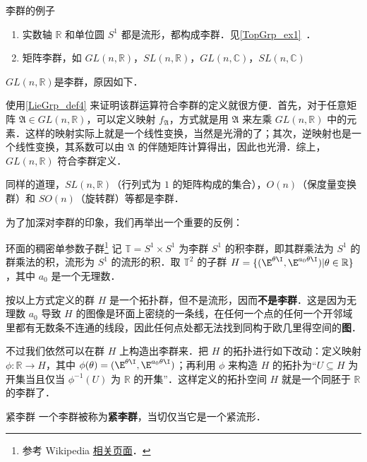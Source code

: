 \begin{example}{李群的例子}
\begin{enumerate}
\item 实数轴 $\mathbb{R}$ 和单位圆 $S^1$ 都是流形，都构成李群．见\autoref{TopGrp_ex1}~．
\item 矩阵李群，如 $GL(n, \mathbb{R})$，$SL(n, \mathbb{R})$，$GL(n, \mathbb{C})$，$SL(n, \mathbb{C})$
\end{enumerate}
\end{example}

$GL(n, \mathbb{R})$是李群，原因如下．

使用\autoref{LieGrp_def4} 来证明该群运算符合李群的定义就很方便．首先，对于任意矩阵 $\mathfrak{A} \in GL(n, \mathbb{R})$，可以定义映射 $f_\mathfrak{A}$，方式就是用 $\mathfrak{A}$ 来左乘 $GL(n, \mathbb{R})$ 中的元素．这样的映射实际上就是一个线性变换，当然是光滑的了；其次，逆映射也是一个线性变换，其系数可以由 $\mathfrak{A}$ 的伴随矩阵计算得出，因此也光滑．综上，$GL(n, \mathbb{R})$ 符合李群定义．

同样的道理，$SL(n, \mathbb{R})$（行列式为 $1$ 的矩阵构成的集合），$O(n)$（保度量变换群）和 $SO(n)$（旋转群）等都是李群．

为了加深对李群的印象，我们再举出一个重要的反例：

\begin{definition}{环面的稠密单参数子群\footnote{参考 Wikipedia \href{https://en.wikipedia.org/wiki/Lie_group}{相关页面}．}}\label{LieGrp_def2}
记 $\mathbb{T}=S^1\times S^1$ 为李群 $S^1$ 的积李群，即其群乘法为 $S^1$ 的群乘法的积，流形为 $S^1$ 的流形的积．取 $\mathbb{T}^2$ 的子群 $H=\{(\E^{\theta\I}, \E^{a_0\theta\I})|\theta\in\mathbb{R}\}$，其中 $a_0$ 是一个无理数．

按以上方式定义的群 $H$ 是一个拓扑群，但不是流形，因而\textbf{不是李群}．这是因为无理数 $a_0$ 导致 $H$ 的图像是环面上密绕的一条线，在任何一个点的任何一个开邻域里都有无数条不连通的线段，因此任何点处都无法找到同构于欧几里得空间的\textbf{图}．

不过我们依然可以在群 $H$ 上构造出李群来．把 $H$ 的拓扑进行如下改动：定义映射 $\phi:\mathbb{R}\to H$，其中 $\phi(\theta)=(\E^{\theta\I}, \E^{a_0\theta\I})$；再利用 $\phi$ 来构造 $H$ 的拓扑为“$U\subseteq H$ 为开集当且仅当 $\phi^{-1}(U)$ 为 $\mathbb{R}$ 的开集”．这样定义的拓扑空间 $H$ 就是一个同胚于 $\mathbb{R}$ 的李群了．
\end{definition}

\begin{definition}{紧李群}
一个李群被称为\textbf{紧李群}，当切仅当它是一个紧流形．
\end{definition}


